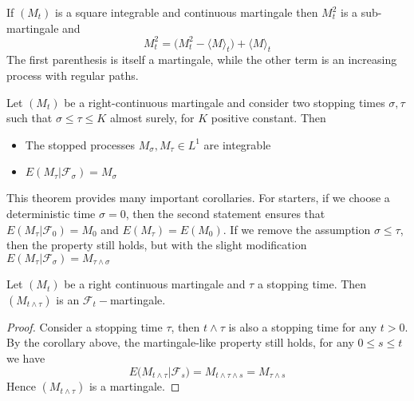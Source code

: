 \begin{proposition}
    If $(M_t)$ is a square integrable and continuous martingale then $M_t^2$ is a sub-martingale and 
    \begin{equation}
        M_t^2 = \big(M_t^2-\langle M \rangle_t\big) + \langle M \rangle_t
    \end{equation}
    The first parenthesis is itself a martingale, while the other term is an increasing process with regular paths. 
\end{proposition}

\begin{theorem}
Let $(M_t)$ be a right-continuous martingale and consider two stopping times $\sigma,\tau$ such that $\sigma \leq \tau \leq K$ almost surely, for $K$ positive constant. Then
\begin{itemize}
    \item The stopped processes $M_{\sigma},M_{\tau} \in L^1$ are integrable  
    \item $E(M_{\tau} \vert \mathcal{F}_{\sigma}) = M_{\sigma}$
\end{itemize}
\end{theorem}

This theorem provides many important corollaries. For starters, if we choose a deterministic time $\sigma = 0$, then the second statement ensures that $E(M_{\tau} \vert \mathcal{F}_0) = M_0$ and $E(M_{\tau}) = E(M_0)$. If we remove the assumption $\sigma \leq \tau$, then the property still holds, but with the slight modification $E(M_{\tau} \vert \mathcal{F}_{\sigma}) = M_{\tau \wedge \sigma}$

\begin{corollary}
    Let $(M_t)$ be a right continuous martingale and $\tau$ a stopping time. Then $(M_{t \wedge \tau})$ is an $\mathcal{F}_t-$martingale.  
\end{corollary}
\begin{proof}
    Consider a stopping time $\tau$, then $t \wedge \tau$ is also a stopping time for any $t > 0$. By the corollary above, the martingale-like property still holds, for any $0 \leq s \leq t$ we have 
    \begin{equation*}
        E\big(M_{t \wedge \tau} \vert \mathcal{F}_s \big) = M_{t \wedge \tau \wedge s} = M_{\tau \wedge s}
    \end{equation*}
    Hence $(M_{t \wedge \tau})$ is a martingale. 
\end{proof}

